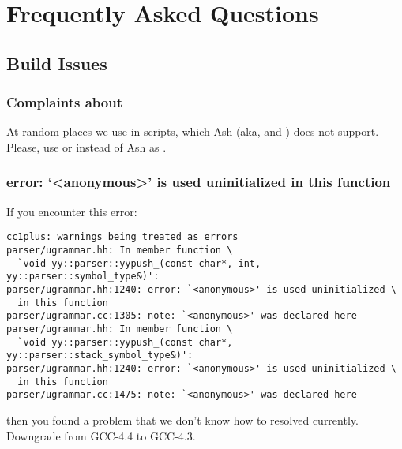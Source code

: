 \chapter{Frequently Asked Questions}
\label{sec:faq}

\ifx\ifHtml\undefined\else
  \let\subsubsectionSave\subsubsection
  \let\subsubsection\faqsection
\fi

\section{Build Issues}
\label{sec:faq:build}

\subsection{Complaints about \samp{+=}}
At random places we use \samp{+=} in  scripts, which Ash
(aka,  and ) does not support.  Please, use
 or  instead of Ash as .

\subsection{error: `<anonymous>' is used uninitialized in this function}
\label{sec:faq:build:uninitialized}

If you encounter this error:

\begin{lstlisting}[language={}]
cc1plus: warnings being treated as errors
parser/ugrammar.hh: In member function \
  `void yy::parser::yypush_(const char*, int, yy::parser::symbol_type&)':
parser/ugrammar.hh:1240: error: `<anonymous>' is used uninitialized \
  in this function
parser/ugrammar.cc:1305: note: `<anonymous>' was declared here
parser/ugrammar.hh: In member function \
  `void yy::parser::yypush_(const char*, yy::parser::stack_symbol_type&)':
parser/ugrammar.hh:1240: error: `<anonymous>' is used uninitialized \
  in this function
parser/ugrammar.cc:1475: note: `<anonymous>' was declared here
\end{lstlisting}

\noindent
then you found a problem that we don't know how to resolved currently.
Downgrade from GCC-4.4 to GCC-4.3.


